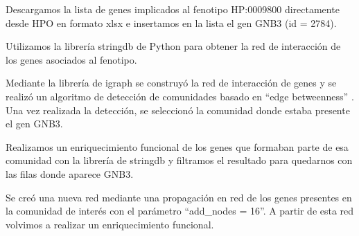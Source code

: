 Descargamos la lista de genes implicados al fenotipo HP:0009800 directamente desde HPO en formato xlsx e insertamos en la lista el gen GNB3 (id = 2784).

Utilizamos la librería stringdb de Python para obtener la red de interacción de los genes asociados al fenotipo.

Mediante la librería de igraph se construyó la red de interacción de genes y se realizó un algoritmo de detección de comunidades basado en ``edge betweenness'' \cite{Girvan2002}. Una vez realizada la detección, se seleccionó la comunidad donde estaba presente el gen GNB3.

Realizamos un enriquecimiento funcional de los genes que formaban parte de esa comunidad con la librería de stringdb y filtramos el resultado para quedarnos con las filas donde aparece GNB3. 

Se creó una nueva red mediante una propagación en red de los genes presentes en la comunidad de interés con el parámetro ``add\_nodes = 16''. A partir de esta red volvimos a realizar un enriquecimiento funcional.